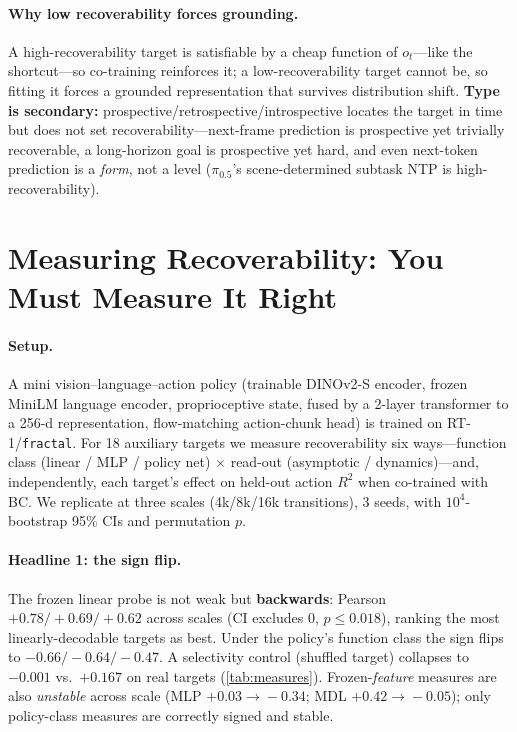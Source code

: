 \documentclass{article}
\begin{document}
\paragraph{Why low recoverability forces grounding.} A high-recoverability target is satisfiable by a cheap
function of $o_t$---like the shortcut---so co-training reinforces it; a low-recoverability target cannot be, so
fitting it forces a grounded representation that survives distribution shift. \textbf{Type is secondary:}
prospective/retrospective/introspective locates the target in time but does not set recoverability---next-frame
prediction is prospective yet trivially recoverable, a long-horizon goal is prospective yet hard, and even
next-token prediction is a \emph{form}, not a level ($\pi_{0.5}$'s scene-determined subtask NTP is
high-recoverability).

\section{Measuring Recoverability: You Must Measure It Right}\label{sec:measure}
\paragraph{Setup.} A mini vision--language--action policy (trainable DINOv2-S encoder, frozen MiniLM language
encoder, proprioceptive state, fused by a 2-layer transformer to a 256-d representation, flow-matching
action-chunk head) is trained on RT-1/\texttt{fractal}. For 18 auxiliary targets we measure recoverability six
ways---function class (linear / MLP / policy net) $\times$ read-out (asymptotic / dynamics)---and, independently,
each target's effect on held-out action $R^2$ when co-trained with BC. We replicate at three scales
(4k/8k/16k transitions), 3 seeds, with $10^4$-bootstrap 95\% CIs and permutation $p$.

\paragraph{Headline 1: the sign flip.} The frozen linear probe is not weak but \textbf{backwards}: Pearson
$+0.78/+0.69/+0.62$ across scales (CI excludes 0, $p\le0.018$), ranking the most linearly-decodable targets as
best. Under the policy's function class the sign flips to $-0.66/-0.64/-0.47$. A selectivity control (shuffled
target) collapses to $-0.001$ vs.\ $+0.167$ on real targets (\cref{tab:measures}). Frozen-\emph{feature} measures
are also \emph{unstable} across scale (MLP $+0.03\!\to\!-0.34$; MDL $+0.42\!\to\!-0.05$); only policy-class measures
are correctly signed and stable.
\end{document}
